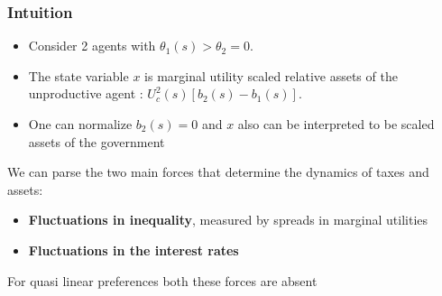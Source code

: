 \documentclass{beamer}
\begin{document}
\begin{frame}
\frametitle{Intuition}

\begin{itemize}
 \item Consider 2 agents with $\theta_1(s)>\theta_2=0$. 
 \item The state variable $x$ is marginal utility scaled relative assets of the unproductive agent : $U^2_c(s)[b_{2}(s)-b_{1}(s)]$.
 \item One can normalize $b_{2}(s)=0$ and $x$ also can be interpreted to be scaled assets of the government
 \end{itemize}
 
We can parse the  two main forces that determine the dynamics of taxes and assets: 
\begin{itemize}
 \item \textbf{Fluctuations in inequality}, measured by spreads in marginal utilities
\item  \textbf{Fluctuations in the interest rates  }
\end{itemize}
For quasi linear preferences both these forces are absent  

\end{frame}
\end{document}

